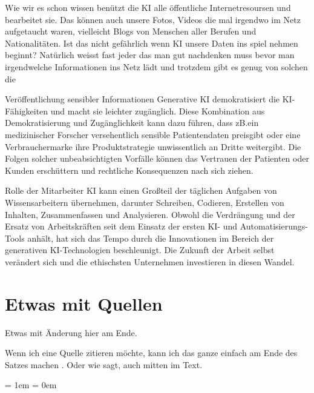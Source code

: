 \documentclass{report}
\begin{document}
 Wie wir es schon wissen benützt die KI alle öffentliche Internetresoursen und bearbeitet sie. Das können auch unsere Fotos, Videos 
 die mal irgendwo im Netz aufgetaucht waren, vielleicht  Blogs von Menschen aller Berufen und Nationalitäten. 
Ist das nicht gefährlich wenn KI unsere Daten ins spiel nehmen beginnt? Natürlich weisst fast jeder das man gut nachdenken 
muss bevor man irgendwelche Informationen ins Netz lädt und trotzdem gibt es genug von solchen die 


Veröffentlichung sensibler Informationen
Generative KI demokratisiert die KI-Fähigkeiten und macht sie leichter zugänglich. 
Diese Kombination aus Demokratisierung und Zugänglichkeit kann dazu führen, dass zB.ein medizinischer 
Forscher versehentlich sensible Patientendaten preisgibt oder eine Verbrauchermarke ihre Produktstrategie
 unwissentlich an Dritte weitergibt. Die Folgen solcher unbeabsichtigten Vorfälle können das Vertrauen der 
 Patienten oder Kunden erschüttern und rechtliche Konsequenzen nach sich ziehen.

  Rolle der Mitarbeiter
  KI kann einen Großteil der täglichen Aufgaben von Wissensarbeitern übernehmen, darunter Schreiben,
   Codieren, Erstellen von Inhalten, Zusammenfassen und Analysieren. Obwohl die Verdrängung und der Ersatz
   von Arbeitskräften seit dem Einsatz der ersten KI- und Automatisierungs-Tools anhält, hat sich das Tempo 
   durch die Innovationen im Bereich der generativen KI-Technologien beschleunigt. Die Zukunft der Arbeit selbst
   verändert sich und die ethischsten Unternehmen investieren in diesen Wandel.




\section{Etwas mit Quellen}

Etwas mit Änderung hier am Ende.

Wenn ich eine Quelle zitieren möchte, kann ich das ganze einfach am Ende des Satzes machen \citep{example}. Oder wie \citet{example} sagt, auch mitten im Text.

\parskip = 1em %
\parindent = 0em %
\end{document}
